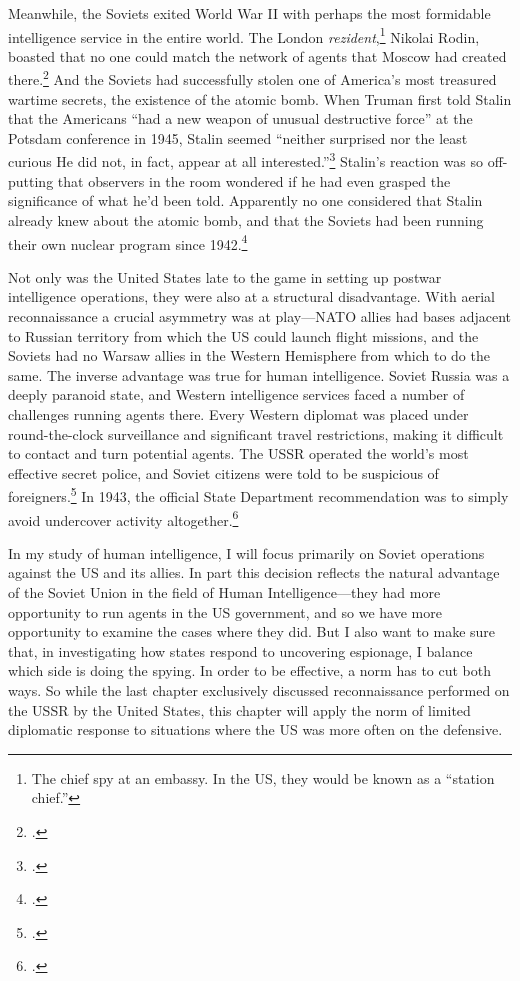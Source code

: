 \documentclass[12pt]{article}
\begin{document}
Meanwhile, the Soviets exited World War II with perhaps the most formidable intelligence service in the entire world. The London \emph{rezident},\footnote{The chief spy at an embassy. In the US, they would be known as a ``station chief.''} Nikolai Rodin, boasted that no one could match the network of agents that Moscow had created there.\footcite[p.~151]{haslam_near_2015} And the Soviets had successfully stolen one of America's most treasured wartime secrets, the existence of the atomic bomb. When Truman first told Stalin that the Americans ``had a new weapon of unusual destructive force'' at the Potsdam conference in 1945, Stalin seemed ``neither surprised nor the least curious \textelp{} He did not, in fact, appear at all interested.''\footcite[p.~443]{mccullough_truman_1992}  Stalin's reaction was so off-putting that observers in the room wondered if he had even grasped the significance of what he'd been told. Apparently no one considered that Stalin already knew about the atomic bomb, and that the Soviets had been running their own nuclear program since 1942.\footcite[p.~443]{mccullough_truman_1992}

Not only was the United States late to the game in setting up postwar intelligence operations, they were also at a structural disadvantage. With aerial reconnaissance a crucial asymmetry was at play---NATO allies had bases adjacent to Russian territory from which the US could launch flight missions, and the Soviets had no Warsaw allies in the Western Hemisphere from which to do the same. The inverse advantage was true for human intelligence. Soviet Russia was a deeply paranoid state, and Western intelligence services faced a number of challenges running agents there. Every Western diplomat was placed under round-the-clock surveillance and significant travel restrictions, making it difficult to contact and turn potential agents. The USSR operated the world's most effective secret police, and Soviet citizens were told to be suspicious of foreigners.\footcite[p.~42]{richelson_american_1987} In 1943, the official State Department recommendation was to simply avoid undercover activity altogether.\footcite[p.~44]{richelson_american_1987}

In my study of human intelligence, I will focus primarily on Soviet operations against the US and its allies. In part this decision reflects the natural advantage of the Soviet Union in the field of Human Intelligence---they had more opportunity to run agents in the US government, and so we have more opportunity to examine the cases where they did. But I also want to make sure that, in investigating how states respond to uncovering espionage, I balance which side is doing the spying. In order to be effective, a norm has to cut both ways. So while the last chapter exclusively discussed reconnaissance performed on the USSR by the United States, this chapter will apply the norm of limited diplomatic response to situations where the US was more often on the defensive.
\end{document}
